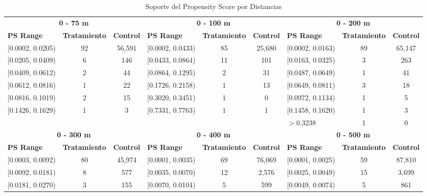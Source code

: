 \begin{table}[htbp]
    \centering
    \caption{Soporte del Propensity Score por Distancias}
    \label{tab:common-support}
    \tiny
    \begin{adjustbox}{max width=\textwidth}
    \begin{tabular}{l c c l c c l c c}
        \toprule
        \multicolumn{3}{c}{\textbf{0 - 75 m}} & \multicolumn{3}{c}{\textbf{0 - 100 m}} & \multicolumn{3}{c}{\textbf{0 - 200 m}} \\
        \cmidrule(lr){1-3} \cmidrule(lr){4-6} \cmidrule(lr){7-9}
        \textbf{PS Range} & \textbf{Tratamiento} & \textbf{Control} & \textbf{PS Range} & \textbf{Tratamiento} & \textbf{Control} & \textbf{PS Range} & \textbf{Tratamiento} & \textbf{Control} \\
        \midrule\relax
        {[}0.0002, 0.0205) & 92 & 56,591 & {[}0.0002, 0.0433) & 85 & 25,680 & {[}0.0002, 0.0163) & 89 & 65,147 \\
        {[}0.0205, 0.0409) & 6 & 146 & {[}0.0433, 0.0864) & 11 & 101 & {[}0.0163, 0.0325) & 3 & 263 \\
        {[}0.0409, 0.0612) & 2 & 44 & {[}0.0864, 0.1295) & 2 & 31 & {[}0.0487, 0.0649) & 1 & 41 \\
        {[}0.0612, 0.0816) & 1 & 22 & {[}0.1726, 0.2158) & 1 & 13 & {[}0.0649, 0.0811) & 3 & 18 \\
        {[}0.0816, 0.1019) & 2 & 15 & {[}0.3020, 0.3451) & 1 & 0 & {[}0.0972, 0.1134) & 1 & 5 \\
        {[}0.1426, 0.1629) & 1 & 3 & {[}0.7331, 0.7763) & 1 & 1 & {[}0.1458, 0.1620) & 1 & 3 \\
         &  &  &  &  &  & $> 0.3238$ & 1 & 0 \\
        \midrule
        \multicolumn{3}{c}{\textbf{0 - 300 m}} & \multicolumn{3}{c}{\textbf{0 - 400 m}} & \multicolumn{3}{c}{\textbf{0 - 500 m}} \\
        \cmidrule(lr){1-3} \cmidrule(lr){4-6} \cmidrule(lr){7-9}
        \textbf{PS Range} & \textbf{Tratamiento} & \textbf{Control} & \textbf{PS Range} & \textbf{Tratamiento} & \textbf{Control} & \textbf{PS Range} & \textbf{Tratamiento} & \textbf{Control} \\
        \midrule\relax
        {[}0.0003, 0.0092) & 80 & 45,974 & {[}0.0001, 0.0035) & 69 & 76,069 & {[}0.0001, 0.0025) & 59 & 87,810 \\
        {[}0.0092, 0.0181) & 8 & 577 & {[}0.0035, 0.0070) & 12 & 2,576 & {[}0.0025, 0.0049) & 15 & 3,699 \\
        {[}0.0181, 0.0270) & 3 & 155 & {[}0.0070, 0.0104) & 5 & 599 & {[}0.0049, 0.0074) & 5 & 861 \\

\end{tabular}
\end{adjustbox}
\end{table}
